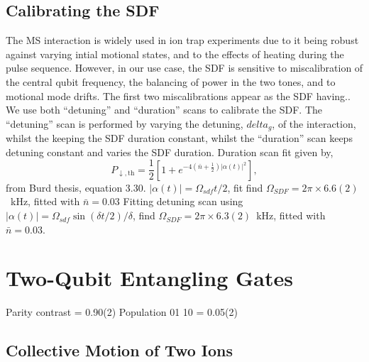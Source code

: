 \documentclass[12pt]{report}
\begin{document}
\subsection{Calibrating the SDF}
    The MS interaction is widely used in ion trap experiments due to it being robust against varying intial motional states, and to the effects of heating during the pulse sequence. However, in our use case, the SDF is sensitive to miscalibration of the central qubit frequency, the balancing of power in the two tones, and to motional mode drifts. The first two miscalibrations appear as the SDF having..
    We use both ``detuning'' and ``duration'' scans to calibrate the SDF. The
    ``detuning'' scan is performed by varying the detuning, $delta_g$, of the interaction, whilst the keeping the SDF duration constant, whilst the ``duration'' scan keeps detuning constant and varies the SDF duration.
    Duration scan fit given by,
    \begin{equation}
        P_{\downarrow,\mathrm{th}} = \frac{1}{2} \left[ 1 + e^{-4\left( \bar{n} + \frac{1}{2} \right) |\alpha(t)|^2} \right],
    \end{equation}
    from Burd thesis, equation 3.30.
    $|\alpha(t)| = \Omega_{sdf} t/2$, fit find $\Omega_{SDF} = 2\pi\times 6.6(2)$~kHz, fitted with $\bar{n} = 0.03$
    Fitting detuning scan using
    $|\alpha(t)| = \Omega_{sdf} \sin(\delta t/2)/\delta$, find $\Omega_{SDF} = 2\pi\times 6.3(2)$~kHz, fitted with $\bar{n} = 0.03$.



\section{Two-Qubit Entangling Gates}
\label{sec:Two-Qubit Entangling Gates}
    Parity contrast = 0.90(2)
    Population 01 10 = 0.05(2)

\subsection{Collective Motion of Two Ions}
\end{document}
